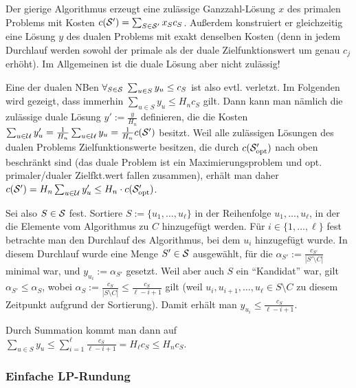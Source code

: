 \begin{Beweis}
    Der gierige Algorithmus erzeugt eine zulässige Ganzzahl-Lösung $x$ des primalen Problems
    mit Kosten $c(\S') = \sum_{S \in \S'} x_S c_S$.
    Außerdem konstruiert er gleichzeitig eine Lösung $y$ des dualen Problems mit
    exakt denselben Kosten
    (denn in jedem Durchlauf werden sowohl der primale als der duale Zielfunktionswert um
    genau $c_j$ erhöht).
    Im Allgemeinen ist die duale Lösung aber nicht zulässig!

    Eine der dualen NBen $\forall_{S \in \S}\; \sum_{u \in S} y_u \le c_S$
    ist also evtl. verletzt.
    Im Folgenden wird gezeigt, dass immerhin $\sum_{u \in S} y_u \le H_n c_S$ gilt.
    Dann kann man nämlich die zulässige duale Lösung $y' := \frac{y}{H_n}$ definieren,
    die die Kosten $\sum_{u \in \U} y_u' = \frac{1}{H_n} \sum_{u \in \U} y_u =
    \frac{1}{H_n} c(\S')$ besitzt.
    Weil alle zulässigen Lösungen des dualen Problems Zielfunktionswerte besitzen,
    die durch $c(\S_\opt')$ nach oben beschränkt sind
    (das duale Problem ist ein Maximierungsproblem und
    opt. primaler/dualer Zielfkt.wert fallen zusammen),
    erhält man daher
    $c(\S') = H_n \sum_{u \in \U} y_u' \le H_n \cdot c(\S_\opt')$.

    Sei also $S \in \S$ fest.
    Sortiere $S := \{u_1, \dotsc, u_\ell\}$ in der Reihenfolge $u_1, \dotsc, u_\ell$,
    in der die Elemente vom Algorithmus zu $C$ hinzugefügt werden.
    Für $i \in \{1, \dotsc, \ell\}$ fest betrachte man den Durchlauf des Algorithmus, bei dem
    $u_i$ hinzugefügt wurde.
    In diesem Durchlauf wurde eine Menge $S' \in \S$ ausgewählt, für die
    $\alpha_{S'} := \frac{c_{S'}}{|S' \setminus C|}$ minimal war, und $y_{u_i} := \alpha_{S'}$
    gesetzt.
    Weil aber auch $S$ ein "`Kandidat"' war, gilt $\alpha_{S'} \le \alpha_S$,
    wobei $\alpha_S := \frac{c_S}{|S \setminus C|} \le \frac{c_S}{\ell - i + 1}$ gilt
    (weil $u_i, u_{i+1}, \dotsc, u_\ell \in S \setminus C$ zu diesem Zeitpunkt aufgrund der
    Sortierung).
    Damit erhält man $y_{u_i} \le \frac{c_S}{\ell - i + 1}$.

    Durch Summation kommt man dann auf
    $\sum_{u \in S} y_u \le
    \sum_{i=1}^\ell \frac{c_S}{\ell - i + 1} = H_\ell c_S \le H_n c_S$.
\end{Beweis}

\pagebreak

\subsubsection{%
    Einfache LP-Rundung%
}

